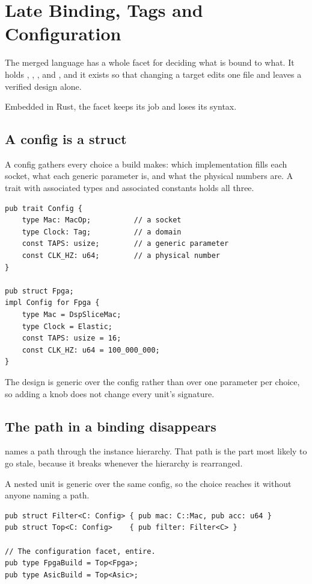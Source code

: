 \section{Late Binding, Tags and Configuration}
\label{sec:e-binding}

The merged language has a whole facet for deciding what is bound to what.
It holds , , ,  and
, and it exists so that changing a target edits one file and
leaves a verified design alone.

Embedded in Rust, the facet keeps its job and loses its syntax.

\subsection{A config is a struct}

A config gathers every choice a build makes: which implementation fills
each socket, what each generic parameter is, and what the physical numbers
are. A trait with associated types and associated constants holds all
three.

\begin{lstlisting}
pub trait Config {
    type Mac: MacOp;          // a socket
    type Clock: Tag;          // a domain
    const TAPS: usize;        // a generic parameter
    const CLK_HZ: u64;        // a physical number
}

pub struct Fpga;
impl Config for Fpga {
    type Mac = DspSliceMac;
    type Clock = Elastic;
    const TAPS: usize = 16;
    const CLK_HZ: u64 = 100_000_000;
}
\end{lstlisting}

The design is generic over the config rather than over one parameter per
choice, so adding a knob does not change every unit's signature.

\subsection{The path in a binding disappears}

 names a path through the
instance hierarchy. That path is the part most likely to go stale, because
it breaks whenever the hierarchy is rearranged.

A nested unit is generic over the same config, so the choice reaches it
without anyone naming a path.

\begin{lstlisting}
pub struct Filter<C: Config> { pub mac: C::Mac, pub acc: u64 }
pub struct Top<C: Config>    { pub filter: Filter<C> }

// The configuration facet, entire.
pub type FpgaBuild = Top<Fpga>;
pub type AsicBuild = Top<Asic>;
\end{lstlisting}

